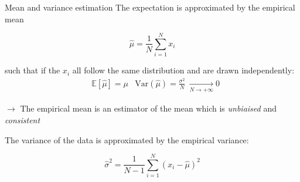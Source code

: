 \documentclass{beamer}
\begin{document}
\begin{frame}{Mean and variance estimation}
The expectation is approximated by the empirical mean

\begin{equation*}
\hat{\mu} = \frac{1}{N} \sum_{i=1}^{N} x_{i}
\end{equation*}


such that if the $x_{i}$ all follow the same distribution and are drawn independently:
\begin{align*}
& \mathbb{E}[\hat{\mu}] = \mu
& \textrm{Var}(\hat{\mu}) = \frac{\sigma^{2}}{N} \  \underset{N\rightarrow +\infty}{\longrightarrow} 0
\end{align*}

$\rightarrow$ The empirical mean is an estimator of the mean which is \emph{unbiaised} and \emph{consistent}\\

\vspace{0.5cm}

The variance of the data is approximated by the empirical variance:

\begin{equation*}
\hat{\sigma}^{2} = \frac{1}{N-1} \sum_{i=1}^{N} (x_{i} - \hat{\mu})^2
\end{equation*}

\end{frame}
\end{document}
